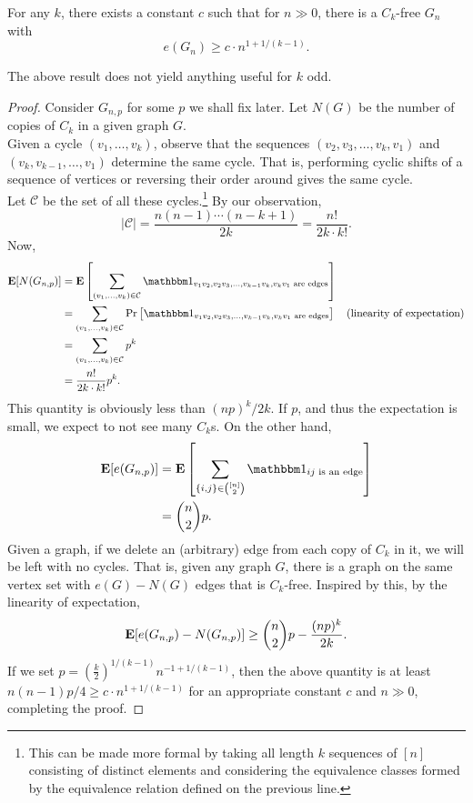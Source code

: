 \documentclass{article}
\begin{document}

			\begin{ftheo}
				\label{theo: C_2k free}
				For any $k$, there exists a constant $c$ such that for $n \gg 0$, there is a $C_k$-free $G_n$ with
				\[ e(G_n) \geq c \cdot n^{1 + 1/(k-1)}. \]
			\end{ftheo}

			The above result does not yield anything useful for $k$ odd.

			\begin{proof}
				Consider $G_{n,p}$ for some $p$ we shall fix later. Let $N(G)$ be the number of copies of $C_k$ in a given graph $G$.\\
				Given a cycle $(v_1,\ldots,v_k)$, observe that the sequences $(v_2,v_3,\ldots,v_k, v_1)$ and $(v_k,v_{k-1},\ldots,v_1)$ determine the same cycle. That is, performing cyclic shifts of a sequence of vertices or reversing their order around gives the same cycle.\\
				Let $\mathcal{C}$ be the set of all these cycles.\footnote{This can be made more formal by taking all length $k$ sequences of $[n]$ consisting of distinct elements and considering the equivalence classes formed by the equivalence relation defined on the previous line.} By our observation,
				\[ |\mathcal{C}| = \frac{n(n-1)\cdots(n-k+1)}{2k} = \frac{n!}{2k\cdot k!}. \]
				Now,
				\begin{align*}
					\expec[N(G_{n,p})] &= \expec\left[ \sum_{(v_1,\ldots,v_k) \in \mathcal{C}} \indic_{v_1v_2, v_2v_3, \ldots, v_{k-1}v_k, v_kv_1\text{ are edges}} \right] \\ 
					&= \sum_{(v_1,\ldots,v_k) \in \mathcal{C}} \Pr\left[ \indic_{v_1v_2, v_2v_3, \ldots, v_{k-1}v_k, v_kv_1\text{ are edges}} \right] & \text{(linearity of expectation)} \\
					&= \sum_{(v_1,\ldots,v_k) \in \mathcal{C}} p^k \\
					&= \frac{n!}{2k \cdot k!} p^k.
				\end{align*}
				This quantity is obviously less than $(np)^k / 2k$. If $p$, and thus the expectation is small, we expect to not see many $C_k$s. On the other hand,
				\begin{align*}
					\expec[e(G_{n,p})] &= \expec \left[ \sum_{\{i,j\} \in \binom{[n]}{2}} \indic_{ij\text{ is an edge}} \right] \\
					&= \binom{n}{2} p.
				\end{align*}
				Given a graph, if we delete an (arbitrary) edge from each copy of $C_k$ in it, we will be left with no cycles. That is, given any graph $G$, there is a graph on the same vertex set with $e(G) - N(G)$ edges that is $C_k$-free. Inspired by this, by the linearity of expectation,
				\[ \textbf{E}[e(G_{n,p}) - N(G_{n,p})] \ge \binom{n}{2} p - \frac{(np)^k}{2k}. \]
				If we set $p = \left(\frac{k}{2}\right)^{1/(k-1)} n^{-1 + 1/(k-1)}$, then the above quantity is at least $n(n-1)p/4 \ge c \cdot n^{1 + 1/(k-1)}$ for an appropriate constant $c$ and $n\gg 0$, completing the proof.
			\end{proof}
\end{document}

